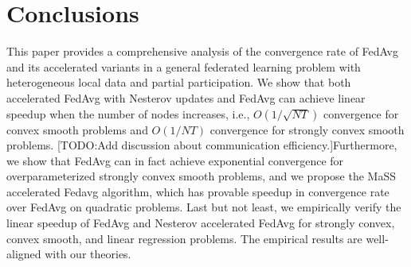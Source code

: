 
\section{Conclusions}
This paper provides a comprehensive analysis of the convergence rate of FedAvg
and its accelerated variants in a general federated learning problem with heterogeneous local data and partial participation. We show that both accelerated FedAvg with Nesterov updates and FedAvg
can achieve linear speedup when the number of nodes increases, i.e., $O(1/\sqrt{NT})$
convergence for convex smooth problems and $O(1/NT)$ convergence for strongly 
convex smooth problems. [TODO:Add discussion about communication efficiency.]Furthermore, we show that FedAvg can in fact achieve exponential 
convergence for overparameterized strongly convex smooth problems, and we propose the MaSS accelerated Fedavg algorithm, which has provable speedup in convergence rate over
FedAvg on quadratic problems. Last but not least, we empirically
verify the linear speedup of FedAvg and Nesterov accelerated FedAvg for strongly convex, convex smooth, and linear regression problems. The empirical results are well-aligned with our theories. 